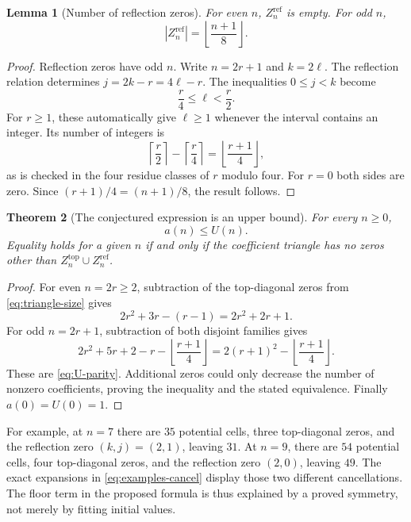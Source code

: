 \documentclass[11pt]{article}
\numberwithin{equation}{section}
\newtheorem{theorem}{Theorem}[section]
\newtheorem{lemma}[theorem]{Lemma}
\theoremstyle{definition}
\theoremstyle{remark}
\newcommand{\U}{U}
\begin{document}
\begin{lemma}[Number of reflection zeros]\label{lem:reflection-count}
For even $n$, $Z_n^{\mathrm{ref}}$ is empty. For odd $n$,
\begin{equation}\label{eq:reflection-count}
 |Z_n^{\mathrm{ref}}|=\left\lfloor\frac{n+1}{8}\right\rfloor.
\end{equation}
\end{lemma}
\begin{proof}
Reflection zeros have odd $n$. Write $n=2r+1$ and $k=2\ell$.
The reflection relation determines
$j=2k-r=4\ell-r$. The inequalities $0\le j<k$ become
\[
 \frac r4\le\ell<\frac r2.
\]
For $r\ge1$, these automatically give $\ell\ge1$ whenever the interval
contains an integer. Its number of integers is
\[
 \left\lceil\frac r2\right\rceil-
 \left\lceil\frac r4\right\rceil
 =\left\lfloor\frac{r+1}{4}\right\rfloor,
\]
as is checked in the four residue classes of $r$ modulo four. For $r=0$
both sides are zero. Since $(r+1)/4=(n+1)/8$, the result follows.
\end{proof}

\begin{theorem}[The conjectured expression is an upper bound]\label{thm:upper}
For every $n\ge0$,
\begin{equation}\label{eq:upper}
 a(n)\le\U(n).
\end{equation}
Equality holds for a given $n$ if and only if the coefficient triangle has
no zeros other than $Z_n^{\mathrm{top}}\cup Z_n^{\mathrm{ref}}$.
\end{theorem}
\begin{proof}
For even $n=2r\ge2$, subtraction of the top-diagonal zeros from
\eqref{eq:triangle-size} gives
\[
 2r^2+3r-(r-1)=2r^2+2r+1.
\]
For odd $n=2r+1$, subtraction of both disjoint families gives
\[
 2r^2+5r+2-r-\left\lfloor\frac{r+1}{4}\right\rfloor
 =2(r+1)^2-\left\lfloor\frac{r+1}{4}\right\rfloor.
\]
These are \eqref{eq:U-parity}. Additional zeros could only decrease the
number of nonzero coefficients, proving the inequality and the stated
equivalence. Finally $a(0)=\U(0)=1$.
\end{proof}

For example, at $n=7$ there are $35$ potential cells, three top-diagonal
zeros, and the reflection zero $(k,j)=(2,1)$, leaving $31$. At $n=9$,
there are $54$ potential cells, four top-diagonal zeros, and the reflection
zero $(2,0)$, leaving $49$. The exact expansions in
\eqref{eq:examples-cancel} display those two different cancellations.
The floor term in the proposed formula is thus explained by a proved
symmetry, not merely by fitting initial values.
\end{document}
